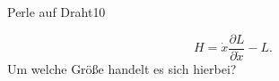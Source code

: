 \begin{exercise}{Perle auf Draht}{10}
\begin{enumerate}
    \begin{equation}
      \label{eqn:Hamilton}
      H = \dot{x}\frac{\partial L}{\partial\dot{x}} - L.
    \end{equation}
    Um welche Grö\ss e handelt es sich hierbei?
    \end{enumerate}
\end{exercise}

